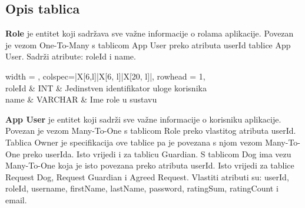 		
			\subsection{Opis tablica}
			
			
			\textbf{Role} je entitet koji sadržava sve važne informacije o rolama aplikacije. Povezan je vezom One-To-Many s tablicom App User preko atributa userId tablice App User. Sadrži atribute: roleId i name.
			
			
			
			
			\begin{longtblr}[
				label=none,
				entry=none
				]{
					width = \textwidth,
					colspec={|X[6,l]|X[6, l]|X[20, l]|}, 
					rowhead = 1,
				} %
				\hline {}	 \\ \hline[3pt]
				roleId	& INT &  Jedinstven identifikator uloge korisnika 	\\ \hline
				name & VARCHAR &  Ime role u sustavu \\ \hline
			 
			\end{longtblr}
			
			\textbf{App User} je entitet koji sadrži sve važne informacije o korisniku aplikacije. Povezan je vezom Many-To-One s tablicom Role preko vlastitog atributa userId. Tablica Owner je specifikacija ove tablice pa je povezana s njom vezom Many-To-One preko userIda. Isto vrijedi i za tablicu Guardian. S tablicom Dog ima vezu Many-To-One koja je isto povezana preko atributa userId. Isto vrijedi za tablice Request Dog, Request Guardian i Agreed Request. Vlastiti atributi su: userId, roleId, username, firstName, lastName, password, ratingSum, ratingCount i email.

				
				

